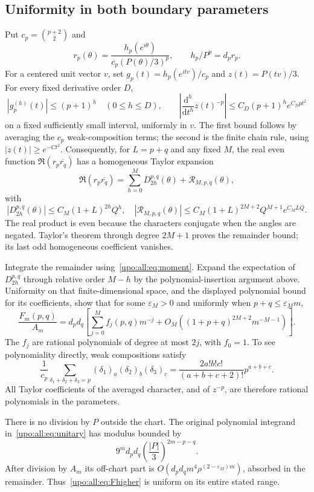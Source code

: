 \documentclass[11pt,letterpaper]{article}
\theoremstyle{remark}\newtheorem{remark}[theorem]{Remark}
\numberwithin{equation}{section}
\newcommand{\fall}[2]{#1^{\underline{#2}}}
\begin{document}
\subsection{Uniformity in both boundary parameters}
Put $c_p=\binom{p+2}{2}$ and
\[
r_p(\theta)=\frac{h_p(e^{i\theta})}{c_p(P(\theta)/3)^p},
\qquad h_p/P^p=d_pr_p.
\]
For a centered unit vector $v$, set $g_p(t)=h_p(e^{itv})/c_p$ and
$z(t)=P(tv)/3$. For every fixed derivative order $D$,
\[
|g_p^{(h)}(t)|\le(p+1)^h\quad(0\le h\le D),\qquad
\left|\frac{\mathrm d^h}{\mathrm dt^h}z(t)^{-p}\right|
 \le C_D(p+1)^h e^{C_Dpt^2}
\]
on a fixed sufficiently small interval, uniformly in $v$. The first
bound follows by averaging the $c_p$ weak-composition terms; the second
is the finite chain rule, using $|z(t)|\ge e^{-Ct^2}$.
Consequently, for $L=p+q$ and any fixed $M$, the real even function
$\Re(r_p\overline{r_q})$ has a homogeneous Taylor expansion
\begin{equation}\label{upo:all:eq:boundaryTaylor}
\Re(r_p\overline{r_q})=\sum_{h=0}^M D_{2h}^{p,q}(\theta)
 +\mathcal R_{M,p,q}(\theta),
\end{equation}
with
\[
|D_{2h}^{p,q}(\theta)|\le C_M(1+L)^{2h}Q^h,
\quad
|\mathcal R_{M,p,q}(\theta)|
 \le C_M(1+L)^{2M+2}Q^{M+1}e^{C_MLQ}.
\]
The real product is even because the characters conjugate when the
angles are negated. Taylor's theorem through degree $2M+1$ proves the
remainder bound; its last odd homogeneous coefficient vanishes.

Integrate the remainder using~\eqref{upo:all:eq:moment}. Expand the expectation
of $D_{2h}^{p,q}$ through relative order $M-h$ by the polynomial-insertion
argument above. Uniformity on that finite-dimensional space, and the
displayed polynomial bound for its coefficients, show that for some
$\varepsilon_M>0$ and uniformly when $p+q\le\varepsilon_M m$,
\begin{equation}\label{upo:all:eq:Fhigher}
\frac{F_m(p,q)}{A_m}=d_pd_q\left[
 \sum_{j=0}^M f_j(p,q)m^{-j}
 +O_M\left((1+p+q)^{2M+2}m^{-M-1}\right)\right].
\end{equation}
The $f_j$ are rational polynomials of degree at most $2j$, with $f_0=1$.
To see polynomiality directly, weak compositions satisfy
\[
\frac1{c_p}\sum_{\delta_1+\delta_2+\delta_3=p}
 (\delta_1)_{\underline a}(\delta_2)_{\underline b}
 (\delta_3)_{\underline c}
 =\frac{2a!b!c!}{(a+b+c+2)!}\fall p{a+b+c}.
\]
All Taylor coefficients of the averaged character, and of $z^{-p}$,
are therefore rational polynomials in the parameters.

There is no division by $P$ outside the chart. The original polynomial
integrand in~\eqref{upo:all:eq:unitary} has modulus bounded by
\[
9^m d_pd_q\left(\frac{|P|}{3}\right)^{2m-p-q}.
\]
After division by $A_m$ its off-chart part is
$O(d_pd_qm^4\rho^{(2-\varepsilon_M)m})$, absorbed in the remainder.
Thus~\eqref{upo:all:eq:Fhigher} is uniform on its entire stated range.
\end{document}
